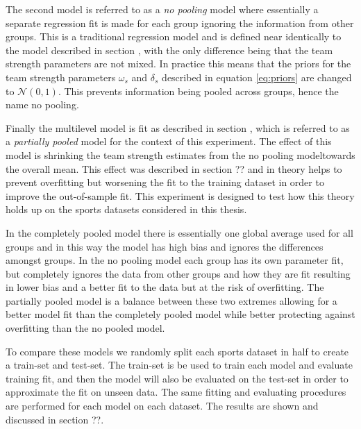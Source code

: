 The second model is referred to as a \textit{no pooling} model where essentially a separate regression fit is made for each group ignoring the information from other groups. This is a traditional regression model and is defined near identically to the model described in section , with the only difference being that the team strength parameters are not mixed. In practice this means that the priors for the team strength parameters $\omega_s$ and $\delta_s$ described in equation \ref{eq:priors} are changed to $\mathcal{N}(0, 1)$. This prevents information being pooled across groups, hence the name no pooling.

Finally the multilevel model is fit as described in section , which is referred to as a \textit{partially pooled} model for the context of this experiment. The effect of this model is shrinking the team strength estimates from the no pooling modeltowards the overall mean. This effect was described in section ?? and in theory helps to prevent overfitting but worsening the fit to the training dataset in order to improve the out-of-sample fit. This experiment is designed to test how this theory holds up on the sports datasets considered in this thesis.

In the completely pooled model there is essentially one global average used for all groups and in this way the model has high bias and ignores the differences amongst groups. In the no pooling model each group has its own parameter fit, but completely ignores the data from other groups and how they are fit resulting in lower bias and a better fit to the data but at the risk of overfitting. The partially pooled model is a balance between these two extremes allowing for a better model fit than the completely pooled model while better protecting against overfitting than the no pooled model.

To compare these models we randomly split each sports dataset in half to create a train-set and test-set. The train-set is be used to train each model and evaluate training fit, and then the model will also be evaluated on the test-set in order to approximate the fit on unseen data. The same fitting and evaluating procedures are performed for each model on each dataset. The results are shown and discussed in section ??.


